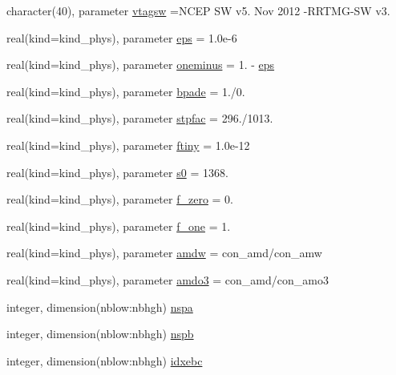 \begin{DoxyCompactItemize}
\item 
character(40), parameter \hyperlink{namespacemodule__radsw__main_a93334abce2ca8bfdcdfe5edd4ae1f093}{vtagsw} =\textquotesingle{}N\+C\+EP SW v5. Nov 2012 -\/R\+R\+T\+MG-\/SW v3. \textquotesingle{}
\item 
real(kind=kind\+\_\+phys), parameter \hyperlink{namespacemodule__radsw__main_a7d311ceb7f824ea31d31ba8144751b5a}{eps} = 1.\+0e-\/6
\item 
real(kind=kind\+\_\+phys), parameter \hyperlink{namespacemodule__radsw__main_ac666738c31ea648cae506a47e5a4e43d}{oneminus} = 1. -\/ \hyperlink{namespacemodule__radsw__main_a7d311ceb7f824ea31d31ba8144751b5a}{eps}
\item 
real(kind=kind\+\_\+phys), parameter \hyperlink{namespacemodule__radsw__main_acd9ae7c14cbfdc55f1f0fff637ca0331}{bpade} = 1./0.
\item 
real(kind=kind\+\_\+phys), parameter \hyperlink{namespacemodule__radsw__main_a4d32ea8f0f1bca37e3351a5ae5077f77}{stpfac} = 296./1013.
\item 
real(kind=kind\+\_\+phys), parameter \hyperlink{namespacemodule__radsw__main_abe91ed52b6016e99a2d0c874524fb27f}{ftiny} = 1.\+0e-\/12
\item 
real(kind=kind\+\_\+phys), parameter \hyperlink{namespacemodule__radsw__main_a244c149eb05c0675a7e040dbf7e2bc4b}{s0} = 1368.
\item 
real(kind=kind\+\_\+phys), parameter \hyperlink{namespacemodule__radsw__main_ad54ac2d2bd5c4b3bd692c76d2a0bcc5d}{f\+\_\+zero} = 0.
\item 
real(kind=kind\+\_\+phys), parameter \hyperlink{namespacemodule__radsw__main_ad256aaca9c9d6b5d161ae21f68989db6}{f\+\_\+one} = 1.
\item 
real(kind=kind\+\_\+phys), parameter \hyperlink{namespacemodule__radsw__main_a1445a63250d89083447371120c484618}{amdw} = con\+\_\+amd/con\+\_\+amw
\item 
real(kind=kind\+\_\+phys), parameter \hyperlink{namespacemodule__radsw__main_a527e5e1cec6ad0800f69a606fde77369}{amdo3} = con\+\_\+amd/con\+\_\+amo3
\item 
integer, dimension(nblow\+:nbhgh) \hyperlink{namespacemodule__radsw__main_a4c0fc140a51c619089128f52e4bb878c}{nspa}
\item 
integer, dimension(nblow\+:nbhgh) \hyperlink{namespacemodule__radsw__main_a6be022a4a1ae32248d9721a9fff93db6}{nspb}
\item 
integer, dimension(nblow\+:nbhgh) \hyperlink{namespacemodule__radsw__main_aa20102786f7e7f8c71fb2783082eac1b}{idxebc}

\end{DoxyCompactItemize}
